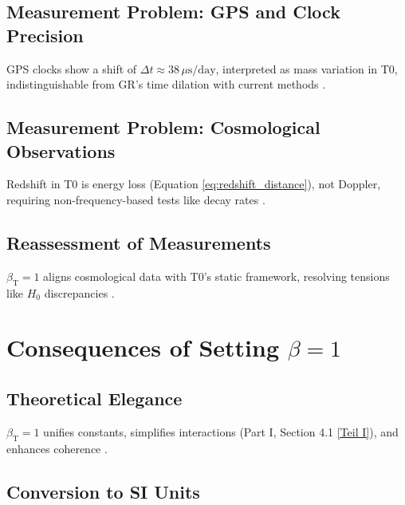 \documentclass[twocolumn,aps,prl]{revtex4-2}
\newcommand{\betaT}{\beta_{\text{T}}}
\begin{document}
	\subsection{Measurement Problem: GPS and Clock Precision}
	\label{subsec:gps_clock_problem}
	
	GPS clocks show a shift of \(\Delta t \approx 38 \, \mu\text{s/day}\), interpreted as mass variation in T0, indistinguishable from GR’s time dilation with current methods \cite{pascher_quantum_2025}.
	
	\subsection{Measurement Problem: Cosmological Observations}
	\label{subsec:cosmological_measurement_problem}
	
	Redshift in T0 is energy loss (Equation \ref{eq:redshift_distance}), not Doppler, requiring non-frequency-based tests like decay rates \cite{pascher_alphabeta_2025}.
	
	\subsection{Reassessment of Measurements}
	\label{subsec:reassessment_measurements}
	
	\(\betaT = 1\) aligns cosmological data with T0’s static framework, resolving tensions like \(H_0\) discrepancies \cite{DiValentino2021}.
	
	\section{Consequences of Setting \(\beta = 1\)}
	\label{sec:consequences_beta}
	
	\subsection{Theoretical Elegance}
	\label{subsec:theoretical_elegance}
	
	\(\betaT = 1\) unifies constants, simplifies interactions (Part I, Section 4.1 \href{https://github.com/jpascher/T0-Time-Mass-Duality/tree/main/2/pdf/English/Bridging Quantum Mechanics and Relativity through Time-Mass Duality Part I Theoretical Foundations_en.pdf}{[Teil I]}), and enhances coherence \cite{pascher_alphabeta_2025}.
	
	\subsection{Conversion to SI Units}
	\label{subsec:conversion_si}
	
\end{document}
